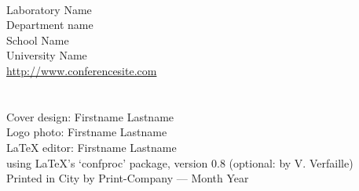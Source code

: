 

\frontmatter
\frontmattertocstyle
\setcounter{page}{1}
\maketitle
\renewcommand{\contentsname}{\texorpdfstring{}{Conference Program}}
\newpage
\vspace*{1.7cm}
\thispagestyle{empty}
\\ Laboratory Name\\ Department name\\
School Name\\ University Name\\
\url{http://www.conferencesite.com}\\
\vspace*{0.15cm}\newline
{}\\
\vspace*{0.35cm}\newline
{}\\
Cover design: Firstname Lastname\\
Logo photo: Firstname Lastname\\
\LaTeX{} editor: Firstname Lastname\\
using \LaTeX's `confproc' package, version 0.8 (optional: by V. Verfaille)\\
\vspace*{0.35cm}\newline
\noindent  Printed in City by Print-Company --- Month Year
\otherpagestyle
\clearsingleordoublepage
\vspace*{0.6cm}
\thisotherpagestyle
{}
